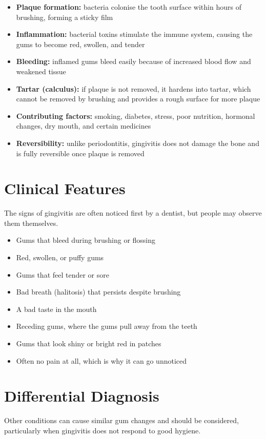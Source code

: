 \begin{itemize}
    \item \textbf{Plaque formation:} bacteria colonise the tooth surface within hours of brushing, forming a sticky film
    \item \textbf{Inflammation:} bacterial toxins stimulate the immune system, causing the gums to become red, swollen, and tender
    \item \textbf{Bleeding:} inflamed gums bleed easily because of increased blood flow and weakened tissue
    \item \textbf{Tartar (calculus):} if plaque is not removed, it hardens into tartar, which cannot be removed by brushing and provides a rough surface for more plaque
    \item \textbf{Contributing factors:} smoking, diabetes, stress, poor nutrition, hormonal changes, dry mouth, and certain medicines
    \item \textbf{Reversibility:} unlike periodontitis, gingivitis does not damage the bone and is fully reversible once plaque is removed
\end{itemize}

\section*{Clinical Features}
The signs of gingivitis are often noticed first by a dentist, but people may observe them themselves.

\begin{itemize}
    \item Gums that bleed during brushing or flossing
    \item Red, swollen, or puffy gums
    \item Gums that feel tender or sore
    \item Bad breath (halitosis) that persists despite brushing
    \item A bad taste in the mouth
    \item Receding gums, where the gums pull away from the teeth
    \item Gums that look shiny or bright red in patches
    \item Often no pain at all, which is why it can go unnoticed
\end{itemize}

\section*{Differential Diagnosis}
Other conditions can cause similar gum changes and should be considered, particularly when gingivitis does not respond to good hygiene.

